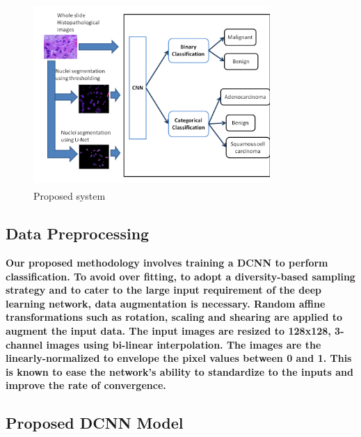 \documentclass[conference]{IEEEtran}
\begin{document}
\begin{figure}[htbp]
\centerline{\includegraphics[width=9cm, height=7cm]{./figures/proposed_system.png}}
\caption{Proposed system}
\label{proposed sys}
\end{figure}

\subsection{Data Preprocessing}
\label{sect_datapreprocess}

\textbf{
Our proposed methodology involves training a DCNN to perform classification. To avoid over fitting, to adopt a diversity-based sampling strategy and to cater to the large input requirement of the deep learning network, data augmentation is necessary. Random affine transformations such as rotation, scaling and shearing are applied to augment the input data. The input images are resized to 128x128, 3-channel images using bi-linear interpolation. The images are the linearly-normalized to envelope the pixel values between 0 and 1. This is known to ease the network's ability to standardize to the inputs and improve the rate of convergence.
}

\subsection{Proposed DCNN Model}
\end{document}

